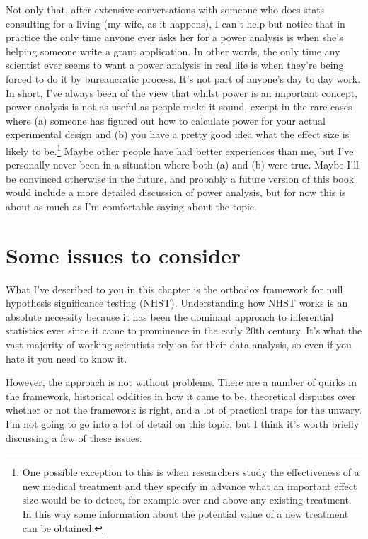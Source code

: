 \documentclass[
  a4paper,
]{book}
\begin{document}
Not only that, after extensive conversations with someone who does stats
consulting for a living (my wife, as it happens), I can't help but
notice that in practice the only time anyone ever asks her for a power
analysis is when she's helping someone write a grant application. In
other words, the only time any scientist ever seems to want a power
analysis in real life is when they're being forced to do it by
bureaucratic process. It's not part of anyone's day to day work. In
short, I've always been of the view that whilst power is an important
concept, power analysis is not as useful as people make it sound, except
in the rare cases where (a) someone has figured out how to calculate
power for your actual experimental design and (b) you have a pretty good
idea what the effect size is likely to be.\footnote{One possible
  exception to this is when researchers study the effectiveness of a new
  medical treatment and they specify in advance what an important effect
  size would be to detect, for example over and above any existing
  treatment. In this way some information about the potential value of a
  new treatment can be obtained.} Maybe other people have had better
experiences than me, but I've personally never been in a situation where
both (a) and (b) were true. Maybe I'll be convinced otherwise in the
future, and probably a future version of this book would include a more
detailed discussion of power analysis, but for now this is about as much
as I'm comfortable saying about the topic.

\section{Some issues to consider}\label{some-issues-to-consider}

What I've described to you in this chapter is the orthodox framework for
null hypothesis significance testing (NHST). Understanding how NHST
works is an absolute necessity because it has been the dominant approach
to inferential statistics ever since it came to prominence in the early
20th century. It's what the vast majority of working scientists rely on
for their data analysis, so even if you hate it you need to know it.

However, the approach is not without problems. There are a number of
quirks in the framework, historical oddities in how it came to be,
theoretical disputes over whether or not the framework is right, and a
lot of practical traps for the unwary. I'm not going to go into a lot of
detail on this topic, but I think it's worth briefly discussing a few of
these issues.
\end{document}
